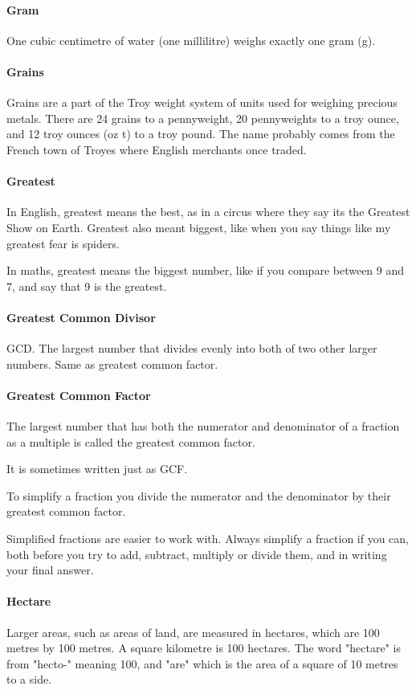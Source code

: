 \documentclass[12pt]{article}
\begin{document}
\paragraph{Gram}
One cubic centimetre of water (one millilitre) weighs exactly one gram (g).

\paragraph{Grains}
Grains are a part of the Troy weight system of units used for weighing precious metals. There are 24 grains to a pennyweight, 20 pennyweights to a troy ounce, and 12 troy ounces (oz t) to a troy pound. The name probably comes from the French town of Troyes where English merchants once traded.

\paragraph{Greatest} In English, greatest means the best, as in a circus where they say its the Greatest Show on Earth. Greatest also meant biggest, like when you say things like my greatest fear is spiders.

In maths, greatest means the biggest number, like if you compare between 9 and 7, and say that 9 is the greatest.

\paragraph{Greatest Common Divisor}
GCD. The largest number that divides evenly into both of two other larger numbers. Same as greatest common factor.

\paragraph{Greatest Common Factor}
The largest number that has both the numerator and denominator of a fraction as a multiple is called the greatest common factor.

It is sometimes written just as GCF.

To simplify a fraction you divide the numerator and the denominator  by their greatest common factor.

Simplified fractions are easier to work with. Always simplify a fraction if you can, both before you try to add, subtract, multiply or divide them, and in writing your final answer.

\paragraph{Hectare}
Larger areas, such as areas of land, are measured in hectares, which are 100 metres by 100 metres. A square kilometre is 100 hectares. The word "hectare" is from "hecto-" meaning 100, and "are" which is the area of a square of 10 metres to a side.
\end{document}
